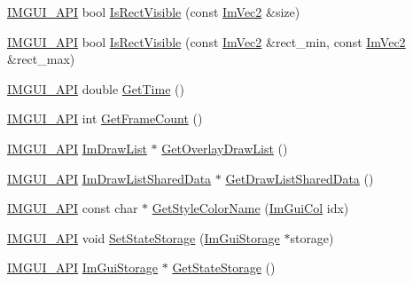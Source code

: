 \begin{DoxyCompactItemize}
\item 
\mbox{\hyperlink{imgui_8h_a43829975e84e45d1149597467a14bbf5}{I\+M\+G\+U\+I\+\_\+\+A\+PI}} bool \mbox{\hyperlink{namespace_im_gui_a578ead6237b3ed05497ed361f18d9f97}{Is\+Rect\+Visible}} (const \mbox{\hyperlink{struct_im_vec2}{Im\+Vec2}} \&size)
\item 
\mbox{\hyperlink{imgui_8h_a43829975e84e45d1149597467a14bbf5}{I\+M\+G\+U\+I\+\_\+\+A\+PI}} bool \mbox{\hyperlink{namespace_im_gui_a5aca7e6939e07caaca489aa8c776fd81}{Is\+Rect\+Visible}} (const \mbox{\hyperlink{struct_im_vec2}{Im\+Vec2}} \&rect\+\_\+min, const \mbox{\hyperlink{struct_im_vec2}{Im\+Vec2}} \&rect\+\_\+max)
\item 
\mbox{\hyperlink{imgui_8h_a43829975e84e45d1149597467a14bbf5}{I\+M\+G\+U\+I\+\_\+\+A\+PI}} double \mbox{\hyperlink{namespace_im_gui_a3f983cf463367c8fd3a3d5793639dc59}{Get\+Time}} ()
\item 
\mbox{\hyperlink{imgui_8h_a43829975e84e45d1149597467a14bbf5}{I\+M\+G\+U\+I\+\_\+\+A\+PI}} int \mbox{\hyperlink{namespace_im_gui_a0180211f23fc10807dfc3d2f6e8681f9}{Get\+Frame\+Count}} ()
\item 
\mbox{\hyperlink{imgui_8h_a43829975e84e45d1149597467a14bbf5}{I\+M\+G\+U\+I\+\_\+\+A\+PI}} \mbox{\hyperlink{struct_im_draw_list}{Im\+Draw\+List}} $\ast$ \mbox{\hyperlink{namespace_im_gui_aa992d915c56bb56a87737964352614ae}{Get\+Overlay\+Draw\+List}} ()
\item 
\mbox{\hyperlink{imgui_8h_a43829975e84e45d1149597467a14bbf5}{I\+M\+G\+U\+I\+\_\+\+A\+PI}} \mbox{\hyperlink{struct_im_draw_list_shared_data}{Im\+Draw\+List\+Shared\+Data}} $\ast$ \mbox{\hyperlink{namespace_im_gui_a2a5a77bd5b6215e8cb47a8a457224a52}{Get\+Draw\+List\+Shared\+Data}} ()
\item 
\mbox{\hyperlink{imgui_8h_a43829975e84e45d1149597467a14bbf5}{I\+M\+G\+U\+I\+\_\+\+A\+PI}} const char $\ast$ \mbox{\hyperlink{namespace_im_gui_a265d7614c4c0b92ba6dd43946a3293e0}{Get\+Style\+Color\+Name}} (\mbox{\hyperlink{imgui_8h_a1b0467ec582e731ae6292fef726fb5fe}{Im\+Gui\+Col}} idx)
\item 
\mbox{\hyperlink{imgui_8h_a43829975e84e45d1149597467a14bbf5}{I\+M\+G\+U\+I\+\_\+\+A\+PI}} void \mbox{\hyperlink{namespace_im_gui_a5ba1bf82e3ecdd09dcb6ad733bcf5726}{Set\+State\+Storage}} (\mbox{\hyperlink{struct_im_gui_storage}{Im\+Gui\+Storage}} $\ast$storage)
\item 
\mbox{\hyperlink{imgui_8h_a43829975e84e45d1149597467a14bbf5}{I\+M\+G\+U\+I\+\_\+\+A\+PI}} \mbox{\hyperlink{struct_im_gui_storage}{Im\+Gui\+Storage}} $\ast$ \mbox{\hyperlink{namespace_im_gui_aa2b8fa1a5320cd70f23a53d8fe604fb2}{Get\+State\+Storage}} ()

\end{DoxyCompactItemize}
